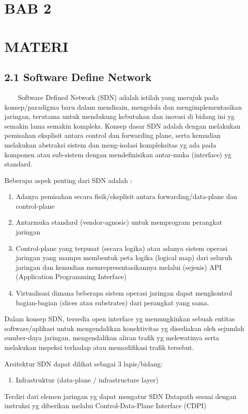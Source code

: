 \section{BAB 2}
\section{MATERI}
\subsection{2.1 Software Define Network}
\ \ \ \ Software Defined Network (SDN) adalah istilah yang merujuk pada konsep/paradigma baru dalam mendisain, mengelola dan
mengimplementasikan jaringan, terutama untuk mendukung kebutuhan dan inovasi di bidang ini yg semakin lama semakin
kompleks. Konsep dasar SDN adalah dengan melakukan pemisahan eksplisit antara control dan forwarding plane, serta
kemudian melakukan abstraksi sistem dan meng-isolasi kompleksitas yg ada pada komponen atau sub-sistem dengan
mendefinisikan antar-muka (interface) yg standard.

Beberapa aspek penting dari SDN adalah :
\liststyleLii
\begin{enumerate}
\item Adanya pemisahan secara fisik/eksplisit antara forwarding/data-plane dan control-plane
\item Antarmuka standard (vendor-agnosic) untuk memprogram perangkat jaringan
\item Control-plane yang terpusat (secara logika) atau adanya sistem operasi jaringan yang mampu membentuk peta logika
(logical map) dari seluruh jaringan dan kemudian memrepresentasikannya melalui (sejenis) API (Application Programming
Interface)
\item Virtualisasi dimana beberapa sistem operasi jaringan dapat mengkontrol bagian-bagian (slices atau substrates) dari
perangkat yang sama.
\end{enumerate}

Dalam konsep SDN, tersedia open interface yg memungkinkan sebuah entitas software/aplikasi untuk mengendalikan
konektivitas yg disediakan oleh sejumlah sumber-daya jaringan, mengendalikan aliran trafik yg melewatinya serta
melakukan inspeksi terhadap atau memodifikasi trafik tersebut.

Arsitektur SDN dapat dilihat sebagai 3 lapis/bidang:
\liststyleLiii
\begin{enumerate}
\item Infrastruktur (data-plane / infrastructure layer)
\end{enumerate}
Terdiri dari elemen jaringan yg dapat mengatur SDN Datapath sesuai dengan instruksi yg diberikan melalui
Control-Data-Plane Interface (CDPI)

